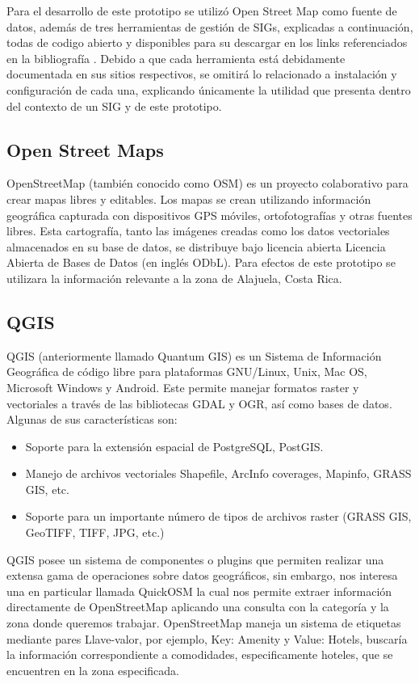 \documentclass{article}
\begin{document}
Para el desarrollo de este prototipo se utiliz\'o Open Street Map como fuente de datos, adem\'as de tres herramientas de gesti\'on de SIGs, explicadas a continuaci\'on, todas de codigo abierto y disponibles para su descargar en los links referenciados en la bibliograf\'ia \cite{qgis} \cite{geoserver} \cite{leaflet}. Debido a que cada herramienta est\'a debidamente documentada en sus sitios respectivos, se omitir\'a lo relacionado a instalaci\'on y configuraci\'on de cada una, explicando \'unicamente la utilidad que presenta dentro del contexto de un SIG y de este prototipo. 

\subsection {Open Street Maps}

OpenStreetMap (tambi\'en conocido como OSM) es un proyecto colaborativo para crear mapas libres y editables. Los mapas se crean utilizando informaci\'on geogr\'afica capturada con dispositivos GPS m\'oviles, ortofotograf\'ias y otras fuentes libres. Esta cartograf\'ia, tanto las im\'agenes creadas como los datos vectoriales almacenados en su base de datos, se distribuye bajo licencia abierta Licencia Abierta de Bases de Datos (en inglés ODbL). \cite{osmwiki} Para efectos de este prototipo se utilizara la informaci\'on relevante a la zona de Alajuela, Costa Rica.

\subsection {QGIS}

QGIS (anteriormente llamado Quantum GIS) es un Sistema de Informaci\'on Geogr\'afica de código libre para plataformas GNU/Linux, Unix, Mac OS, Microsoft Windows y Android. Este permite manejar formatos raster y vectoriales a través de las bibliotecas GDAL y OGR, así como bases de datos. \cite{qgiswiki} Algunas de sus características son:
\begin{itemize}
\item Soporte para la extensi\'on espacial de PostgreSQL, PostGIS.
\item Manejo de archivos vectoriales Shapefile, ArcInfo coverages, Mapinfo, GRASS GIS, etc.
\item Soporte para un importante n\'umero de tipos de archivos raster (GRASS GIS, GeoTIFF, TIFF, JPG, etc.)
\end{itemize}
QGIS posee un sistema de componentes o plugins que permiten realizar una extensa gama de operaciones sobre datos geogr\'aficos, sin embargo, nos interesa una en particular llamada QuickOSM la cual nos permite extraer informaci\'on directamente de OpenStreetMap aplicando una consulta con la categor\'ia y la zona donde queremos trabajar. OpenStreetMap maneja un sistema de etiquetas mediante pares Llave-valor, por ejemplo, Key: Amenity y Value: Hotels, buscar\'ia la informaci\'on correspondiente a comodidades, especificamente hoteles, que se encuentren en la zona especificada. 
\end{document}
